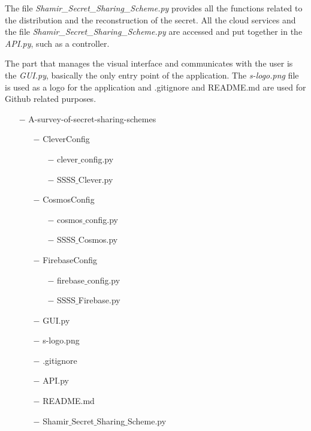\documentclass[12pt, a4paper, oneside]{book}
\begin{document}
    The file {\it Shamir\_Secret\_Sharing\_Scheme.py} provides all the functions related to the distribution and the reconstruction of the secret. All the cloud services and the file {\it Shamir\_Secret\_Sharing\_Scheme.py} are accessed and put together in the {\it API.py}, such as a controller. 
    
    The part that manages the visual interface and communicates with the user is the {\it GUI.py}, basically the only entry point of the application. The {\it s-logo.png} file is used as a logo for the application and .gitignore and README.md are used for Github related purposes.
    \begin{itemize}
        \item[$-$] A-survey-of-secret-sharing-schemes
        \begin{itemize}
            \item[$-$] CleverConfig
                \begin{itemize}
                    \item[$-$] clever$\_$config.py
                    \item[$-$] SSSS$\_$Clever.py
                \end{itemize}
            \item[$-$] CosmosConfig
                \begin{itemize}
                    \item[$-$] cosmos$\_$config.py
                    \item[$-$] SSSS$\_$Cosmos.py
                    \end{itemize}
            \item[$-$] FirebaseConfig
                \begin{itemize}
                    \item[$-$] firebase$\_$config.py
                    \item[$-$] SSSS$\_$Firebase.py
                \end{itemize}
            \item[$-$] GUI.py
            \item[$-$] s-logo.png
            \item[$-$] .gitignore
            \item[$-$] API.py
            \item[$-$] README.md
            \item[$-$] Shamir$\_$Secret$\_$Sharing$\_$Scheme.py
            \end{itemize}
        \end{itemize}
\end{document}
